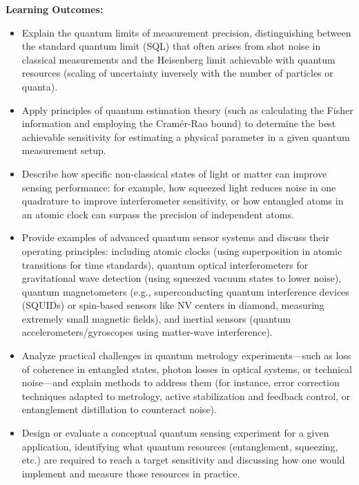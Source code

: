 \documentclass{scrreprt}
\begin{document}
\textbf{Learning Outcomes:}
\begin{itemize}
\item Explain the quantum limits of measurement precision, distinguishing between the standard quantum limit (SQL) that often arises from shot noise in classical measurements and the Heisenberg limit achievable with quantum resources (scaling of uncertainty inversely with the number of particles or quanta).
\item Apply principles of quantum estimation theory (such as calculating the Fisher information and employing the Cramér-Rao bound) to determine the best achievable sensitivity for estimating a physical parameter in a given quantum measurement setup.
\item Describe how specific non-classical states of light or matter can improve sensing performance: for example, how squeezed light reduces noise in one quadrature to improve interferometer sensitivity, or how entangled atoms in an atomic clock can surpass the precision of independent atoms.
\item Provide examples of advanced quantum sensor systems and discuss their operating principles: including atomic clocks (using superposition in atomic transitions for time standards), quantum optical interferometers for gravitational wave detection (using squeezed vacuum states to lower noise), quantum magnetometers (e.g., superconducting quantum interference devices (SQUIDs) or spin-based sensors like NV centers in diamond, measuring extremely small magnetic fields), and inertial sensors (quantum accelerometers/gyroscopes using matter-wave interference).
\item Analyze practical challenges in quantum metrology experiments—such as loss of coherence in entangled states, photon losses in optical systems, or technical noise—and explain methods to address them (for instance, error correction techniques adapted to metrology, active stabilization and feedback control, or entanglement distillation to counteract noise).
\item Design or evaluate a conceptual quantum sensing experiment for a given application, identifying what quantum resources (entanglement, squeezing, etc.) are required to reach a target sensitivity and discussing how one would implement and measure those resources in practice.
\end{itemize}
\end{document}
